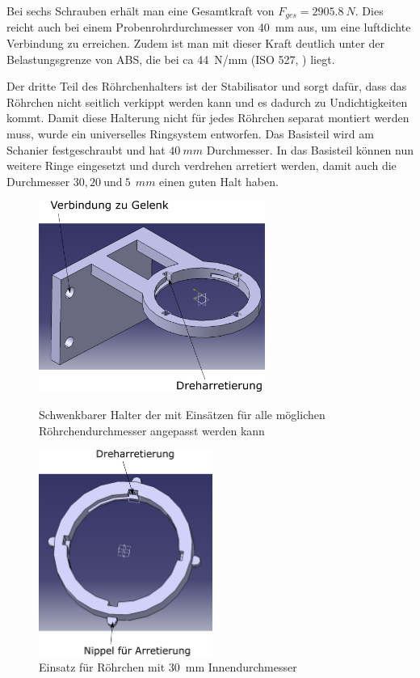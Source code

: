 Bei sechs Schrauben erhält man eine Gesamtkraft von $F_{ges} = \SI{2905,8}{N}$. Dies reicht auch bei einem Probenrohrdurchmesser von \SI{40}{mm} aus, um eine luftdichte Verbindung zu erreichen. Zudem ist man mit dieser Kraft deutlich unter der Belastungsgrenze von ABS, die bei ca \SI{44}{N/mm} (ISO 527, \cite{C.Dallner2006, ThyssenPlastics}) liegt.

Der dritte Teil des Röhrchenhalters ist der Stabilisator und sorgt dafür, dass das Röhrchen nicht seitlich verkippt werden kann und es dadurch zu Undichtigkeiten kommt. Damit diese Halterung nicht für jedes Röhrchen separat montiert werden muss, wurde ein universelles Ringsystem entworfen. Das Basisteil wird am Schanier festgeschraubt und hat $\SI{40}{mm}$ Durchmesser. In das Basisteil können nun weitere Ringe eingesetzt und durch verdrehen arretiert werden, damit auch die Durchmesser $30,20  \ \text{und} \ 5\SI{}{\ mm}$ einen guten Halt haben.

	\begin{figure}[h!]
		\begin{minipage}[hbt]{7.4cm}
			\centering
			\includegraphics[width=7.4cm]{Basishalter.png}
			\caption[Röhrchenhalter oben]{Schwenkbarer Halter der mit Einsätzen für alle möglichen Röhrchendurchmesser angepasst werden kann}
		\end{minipage}
		\hfill
		\begin{minipage}[hbt]{5.7cm}
			\centering
			\includegraphics[width=5.7cm]{Basishalter_Einsatz.png}
			\caption[Röhrchenhalter Einsatz oben]{Einsatz für Röhrchen mit \SI{30}{mm} Innendurchmesser}
		\end{minipage}
	\end{figure}
	
